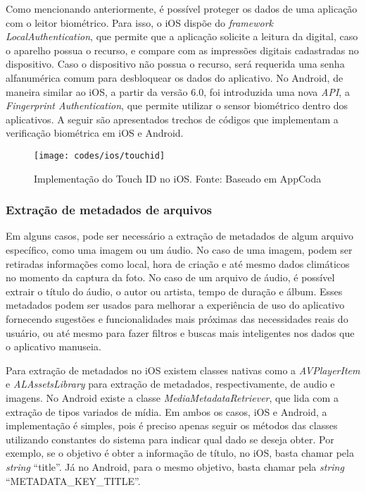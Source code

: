Como mencionando anteriormente, é possível proteger os dados de uma aplicação com o leitor biométrico. Para isso, o iOS dispõe do \textit{framework LocalAuthentication}, que permite que a aplicação solicite a leitura da 
digital, caso o aparelho possua o recurso, e compare com as impressões digitais cadastradas no dispositivo. Caso o dispositivo não possua o recurso, será requerida uma senha alfanumérica comum para desbloquear os dados do 
aplicativo. No Android, de maneira similar ao iOS, a partir da versão 6.0, foi introduzida uma nova \textit{API}, a \textit{Fingerprint Authentication}, que permite utilizar o sensor biométrico dentro dos aplicativos. A 
seguir são apresentados trechos de códigos que implementam a verificação biométrica em iOS e Android.

\begin{figure}[H]
	\centering
	\texttt{[image: codes/ios/touchid]}
	\caption[Implementação do Touch ID no iOS]{Implementação do Touch ID no iOS. Fonte: Baseado em AppCoda\protect\footnotemark}
	\label{fig:forcetouch-ionic}
\end{figure}

\subsubsection{Extração de metadados de arquivos} \label{subsubsec:extracaometadata}
Em alguns casos, pode ser necessário a extração de metadados de algum arquivo específico, como uma imagem ou um áudio. No caso de uma imagem, podem ser retiradas informações como local, hora de criação e até mesmo 
dados climáticos no momento da captura da foto. No caso de um arquivo de áudio, é possível extrair o título do áudio, o autor ou artista, tempo de duração e álbum. Esses metadados podem ser usados para 
melhorar a experiência de uso do aplicativo fornecendo sugestões e funcionalidades mais próximas das necessidades reais do usuário, ou até mesmo para fazer filtros e buscas mais inteligentes nos dados que o 
aplicativo manuseia. 

Para extração de metadados no iOS existem classes nativas como a \textit{AVPlayerItem} e \textit{ALAssetsLibrary} para extração de metadados, respectivamente, de audio e imagens. No Android existe a 
classe \textit{MediaMetadataRetriever}, que lida com a extração de tipos variados de mídia. Em ambos os casos, iOS e Android, a implementação é simples, pois é preciso apenas seguir os métodos das classes 
utilizando constantes do sistema para indicar qual dado se deseja obter. Por exemplo, se o objetivo é obter a informação de título, no iOS, basta chamar pela \textit{string} ``title''. Já no Android, para o mesmo 
objetivo, basta chamar pela \textit{string} ``METADATA\_KEY\_TITLE''.


